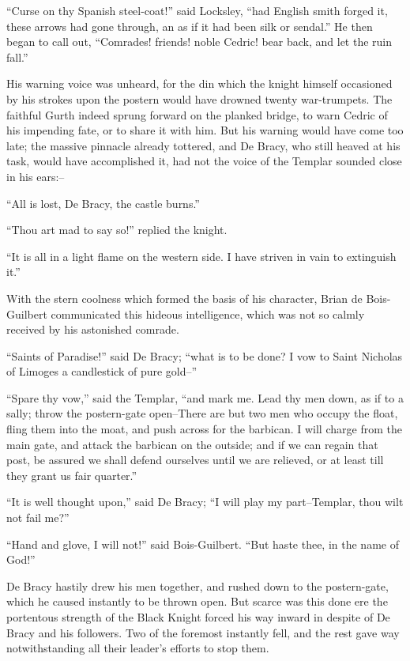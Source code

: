 ``Curse on thy Spanish steel-coat!'' said Locksley, ``had English smith
forged it, these arrows had gone through, an as if it had been silk or
sendal.'' He then began to call out, ``Comrades! friends! noble Cedric!
bear back, and let the ruin fall.''

His warning voice was unheard, for the din which the knight himself
occasioned by his strokes upon the postern would have drowned twenty
war-trumpets. The faithful Gurth indeed sprung forward on the planked
bridge, to warn Cedric of his impending fate, or to share it with him.
But his warning would have come too late; the massive pinnacle already
tottered, and De Bracy, who still heaved at his task, would have
accomplished it, had not the voice of the Templar sounded close in his
ears:--

``All is lost, De Bracy, the castle burns.''

``Thou art mad to say so!'' replied the knight.

``It is all in a light flame on the western side. I have striven in vain
to extinguish it.''

With the stern coolness which formed the basis of his character, Brian
de Bois-Guilbert communicated this hideous intelligence, which was not
so calmly received by his astonished comrade.

``Saints of Paradise!'' said De Bracy; ``what is to be done? I vow to
Saint Nicholas of Limoges a candlestick of pure gold--''

``Spare thy vow,'' said the Templar, ``and mark me. Lead thy men down,
as if to a sally; throw the postern-gate open--There are but two men who
occupy the float, fling them into the moat, and push across for the
barbican. I will charge from the main gate, and attack the barbican on
the outside; and if we can regain that post, be assured we shall defend
ourselves until we are relieved, or at least till they grant us fair
quarter.''

``It is well thought upon,'' said De Bracy; ``I will play my
part--Templar, thou wilt not fail me?''

``Hand and glove, I will not!'' said Bois-Guilbert. ``But haste thee, in
the name of God!''

De Bracy hastily drew his men together, and rushed down to the
postern-gate, which he caused instantly to be thrown open. But scarce
was this done ere the portentous strength of the Black Knight forced his
way inward in despite of De Bracy and his followers. Two of the foremost
instantly fell, and the rest gave way notwithstanding all their leader's
efforts to stop them.

